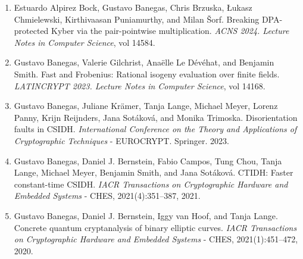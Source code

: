 \begin{enumerate}\small
\item Estuardo Alpirez Bock, Gustavo Banegas, Chris Brzuska, Łukasz Chmielewski, Kirthivaasan Puniamurthy, and Milan Šorf. Breaking DPA-protected Kyber via the pair-pointwise multiplication. \textit{ACNS 2024. Lecture Notes in Computer Science}, vol 14584.
\item Gustavo Banegas, Valerie Gilchrist, Anaëlle Le Dévéhat, and Benjamin Smith. Fast and Frobenius: Rational isogeny evaluation over finite fields. \textit{LATINCRYPT 2023. Lecture Notes in Computer Science}, vol 14168.
\item Gustavo Banegas, Juliane Krämer, Tanja Lange, Michael Meyer, Lorenz Panny, Krijn Reijnders, Jana Sotáková, and Monika Trimoska. Disorientation faults in CSIDH. \textit{International Conference on the Theory and Applications of Cryptographic Techniques} - EUROCRYPT. Springer. 2023.
\item Gustavo Banegas, Daniel J. Bernstein, Fabio Campos, Tung Chou, Tanja Lange, Michael Meyer, Benjamin Smith, and Jana Sotáková. CTIDH: Faster constant-time CSIDH. \textit{IACR Transactions on Cryptographic Hardware and Embedded Systems} - CHES, 2021(4):351–387, 2021.
\item Gustavo Banegas, Daniel J. Bernstein, Iggy van Hoof, and Tanja Lange. Concrete quantum cryptanalysis of binary elliptic curves. \textit{IACR Transactions on Cryptographic Hardware and Embedded Systems} - CHES, 2021(1):451–472, 2020.

\end{enumerate}

